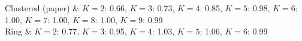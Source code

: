 Clustered (paper) & $K{=}2$: 0.66, $K{=}3$: 0.73, $K{=}4$: 0.85, $K{=}5$: 0.98, $K{=}6$: 1.00, $K{=}7$: 1.00, $K{=}8$: 1.00, $K{=}9$: 0.99\\
Ring & $K{=}2$: 0.77, $K{=}3$: 0.95, $K{=}4$: 1.03, $K{=}5$: 1.06, $K{=}6$: 0.99\\

